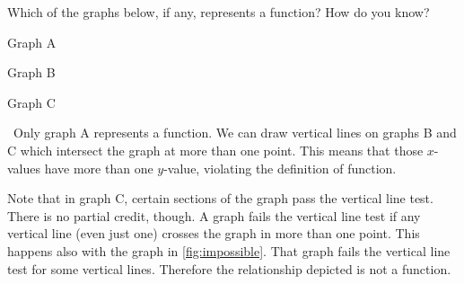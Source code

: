 \begin{boxedex}
Which of the graphs below, if any, represents a function? How do you know?

\begin{minipage}{0.33\textwidth}
\centering
Graph A
\par{}
\end{minipage}
\begin{minipage}{0.33\textwidth}
\centering
Graph B
\par{}
\end{minipage}
\begin{minipage}{0.33\textwidth}
\centering
Graph C
\par{}
\end{minipage}

\exsoln\ Only graph A represents a function. We can draw vertical lines on graphs B and C which intersect the graph at more than one point. This means that those $x$-values have more than one $y$-value, violating the definition of function.
\end{boxedex}

Note that in graph C, certain sections of the graph pass the vertical line test. There is no partial credit, though. A graph fails the vertical line test if any vertical line (even just one) crosses the graph in more than one point. This happens also with the graph in \cref{fig:impossible}. That graph fails the vertical line test for some vertical lines. Therefore the relationship depicted is not a function.

